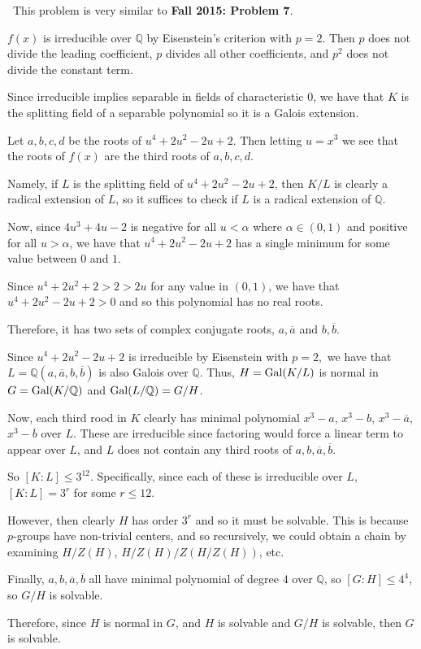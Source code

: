 \documentclass[12pt]{AlgebraQual}
\begin{document}
\begin{solution}$\,$
This problem is very similar to \textbf{Fall 2015: Problem 7}.

$f(x)$ is irreducible over $\mathbb{Q}$ by Eisenstein's criterion with $p=2$. Then $p$ does not divide the leading coefficient, $p$ divides all other coefficients, and $p^2$ does not divide the constant term.

Since irreducible implies separable in fields of characteristic $0$, we have that $K$ is the splitting field of a separable polynomial so it is a Galois extension.

Let $a,b,c,d$ be the roots of $u^4+2u^2-2u+2$. Then letting $u=x^3$ we see that the roots of $f(x)$ are the third roots of $a,b,c,d$.

Namely, if $L$ is the splitting field of $u^4+2u^2-2u+2$, then $K/L$ is clearly a radical extension of $L$, so it suffices to check if $L$ is a radical extension of $\mathbb{Q}$.

Now, since $4u^3+4u-2$ is negative for all $u<\alpha$ where $\alpha\in(0,1)$ and positive for all $u>\alpha$, we have that $u^4+2u^2-2u+2$ has a single minimum for some value between $0$ and $1$.

Since $u^4+2u^2+2>2>2u$ for any value in $(0,1)$, we have that $u^4+2u^2-2u+2>0$ and so this polynomial has no real roots.

Therefore, it has two sets of complex conjugate roots, $a,\overline{a}$ and $b,\overline{b}$.

Since $u^4+2u^2-2u+2$ is irreducible by Eisenstein with $p=2,$ we have that $L=\mathbb{Q}(a,\overline{a},b,\overline{b})$ is also Galois over $\mathbb{Q}$. Thus, $H=\text{Gal}(K/L)$ is normal in $G=\text{Gal}(K/\mathbb{Q})$ and $\text{Gal}(L/\mathbb{Q})=G/H$.

Now, each third rood in $K$ clearly has minimal polynomial $x^3-a$, $x^3-b$, $x^3-\overline{a}$, $x^3-\overline{b}$ over $L$. These are irreducible since factoring would force a linear term to appear over $L$, and $L$ does not contain any third roots of $a,b,\overline{a},\overline{b}$.

So $[K:L]\le 3^{12}$. Specifically, since each of these is irreducible over $L$, $[K:L]=3^r$ for some $r\le12$.

However, then clearly $H$ has order $3^r$ and so it must be solvable. This is because $p$-groups have non-trivial centers, and so recursively, we could obtain a chain by examining $H/Z(H)$, $H/Z(H)/Z(H/Z(H))$, etc.

Finally, $a,b,\overline{a}, \overline{b}$ all have minimal polynomial of degree $4$ over $\mathbb{Q}$, so $[G:H]\le 4^4$, so $G/H$ is solvable.

Therefore, since $H$ is normal in $G$, and $H$ is solvable and $G/H$ is solvable, then $G$ is solvable.
\end{solution}
\newpage
\end{document}
